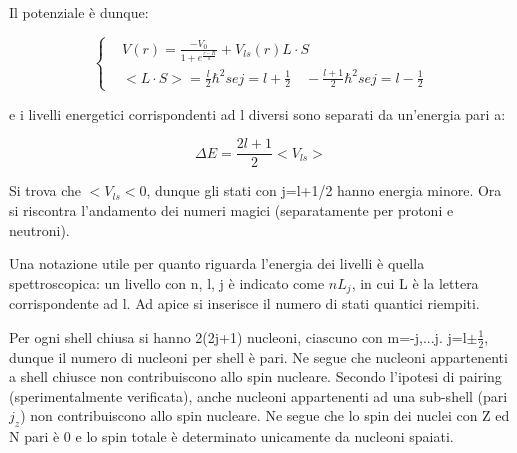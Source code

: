 \documentclass{article}
\begin{document}
Il potenziale è dunque:

\begin{equation}
    \left\{
    \begin{aligned}
         & V(r)=\frac{-V_0}{1+e^{\frac{r-R}{a}}}+V_{ls}(r)L\cdot S                                          \\
         & <L\cdot S>= \frac{l}{2}\hbar^2 se j=l+\frac{1}{2} \quad -\frac{l+1}{2}\hbar^2 se j=l-\frac{1}{2}
    \end{aligned}
    \right.
\end{equation}

e i livelli energetici corrispondenti ad l diversi sono separati da un'energia pari a:

\begin{equation}
    \Delta E= \frac{2l+1}{2}<V_{ls}>
\end{equation}

Si trova che $<V_{ls}<0$, dunque gli stati con j=l+1/2 hanno energia minore.
Ora si riscontra l'andamento dei numeri magici (separatamente per protoni e neutroni).

Una notazione utile per quanto riguarda l'energia dei livelli è quella spettroscopica:
un livello con n, l, j è indicato come $nL_j$, in cui L è la lettera corrispondente ad l.
Ad apice si inserisce il numero di stati quantici riempiti.

Per ogni shell chiusa si hanno 2(2j+1) nucleoni, ciascuno con m=-j,...j.
j=l$\pm \frac{1}{2}$, dunque il numero di nucleoni per shell è pari.
Ne segue che nucleoni appartenenti a shell chiusce non contribuiscono allo spin nucleare.
Secondo l'ipotesi di pairing (sperimentalmente verificata), anche nucleoni appartenenti ad una sub-shell (pari $j_z$) non contribuiscono allo spin nucleare.
Ne segue che lo spin dei nuclei con Z ed N pari è 0 e lo spin totale è determinato unicamente da nucleoni spaiati.
\end{document}

